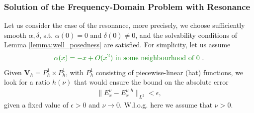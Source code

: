 \subsubsection{Solution of the Frequency-Domain Problem with Resonance}
Let us consider the case of the resonance, more precisely, we choose sufficiently smooth
$\alpha,\delta$, s.t. $\alpha(0)=0$ and $\delta(0)\neq 0$, and the solvability conditions 
of Lemma \ref{lemma:well_posedness}  are satisfied. 
For simplicity, let us assume 
\begin{align}
\label{eq:cond}
 \mrev{\alpha(x)=-x+O(x^2) \text{  in some neighbourhood of $0$ }}.
\end{align}
Given $\mathbf{V}_{h}=P_{h}^{1}\times P_{h}^{1}$, with $P_{h}^{1}$ consisting of piecewise-linear (hat) functions, 
we look for a ratio $h(\nu)$ that would ensure the bound on the absolute error 
\begin{align}
\label{eq:problem1}
\|E^{\nu}_{x}-E^{\nu,h}_{x}\|_{L^2}<\epsilon,
\end{align}
given a fixed value of $\epsilon>0$ and $\nu\rightarrow 0$. W.l.o.g. here we assume that $\nu>0$. 

